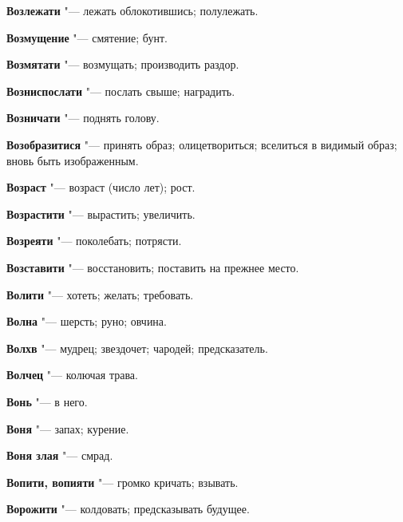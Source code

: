 \begin{mymulticols}{2}
\noindent\textbf{Возлежати} "--- лежать облокотившись; полулежать. 




\noindent\textbf{Возмущение} "--- смятение; бунт. 




\noindent\textbf{Возмятати} "--- возмущать; производить раздор. 




\noindent\textbf{Возниспослати} "--- послать свыше; наградить. 




\noindent\textbf{Возничати} "--- поднять голову. 




\noindent\textbf{Возобразитися} "--- принять образ; олицетвориться; вселиться в видимый образ; вновь быть изображенным. 




\noindent\textbf{Возраст} "--- возраст (число лет); рост. 




\noindent\textbf{Возрастити} "--- вырастить; увеличить. 




\noindent\textbf{Возреяти} "--- поколебать; потрясти. 




\noindent\textbf{Возставити} "--- восстановить; поставить на прежнее место. 




\noindent\textbf{Волити} "--- хотеть; желать; требовать. 




\noindent\textbf{Волна} "--- шерсть; руно; овчина. 




\noindent\textbf{Волхв} "--- мудрец; звездочет; чародей; предсказатель. 




\noindent\textbf{Волчец} "--- колючая трава. 




\noindent\textbf{Вонь} "--- в него. 




\noindent\textbf{Воня} "--- запах; курение. 




\noindent\textbf{Воня злая} "--- смрад. 




\noindent\textbf{Вопити, вопияти} "--- громко кричать; взывать. 




\noindent\textbf{Ворожити} "--- колдовать; предсказывать будущее. 





\end{mymulticols}
